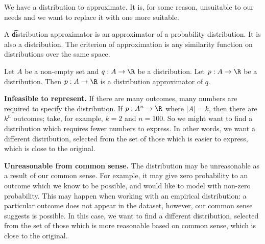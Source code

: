 

We have a distribution to approximate.
It is, for some reason, unsuitable to our needs and we want to replace it with one more suitable.


A \t{distribution approximator} is an approximator of a probability distribution.
It is also a distribution.
The criterion of approximation is any similarity function on distributions over the same space.


Let $A$ be a non-empty set and $q: A \to \R $ be a distribution.
Let $p: A \to \R $ be a distribution.
Then $p: A \to \R $ is a distribution approximator of $q$.



\textbf{Infeasible to represent.}
If there are many outcomes, many numbers are required to specify the distribution.
If $p: A^n \to \R $ where $\mid A\mid  = k$, then there are $k^n$ outcomes; take, for example, $k = 2$ and $n = 100$.
So we might want to find a distribution which requires fewer numbers to express.
In other words, we want a different distribution, selected from the set of those which is easier to express, which is close to the original.

\textbf{Unreasonable from common sense.}
The distribution may be unreasonable as a result of our common sense.
For example, it may give zero probability to an outcome which we know to be possible, and would like to model with non-zero probability.
This may happen when working with an empirical distribution: a particular outcome does not appear in the dataset, however, our common sense suggests is possible.
In this case, we want to find a different distribution, selected from the set of those which is more reasonable based on common sense, which is close to the original.
